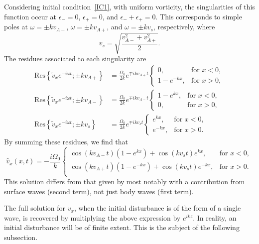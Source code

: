 \documentclass[12pt]{../style-files/ociamthesis}
\begin{document}
Considering initial condition~\ref{IC1}, with uniform vorticity, the singularities of this function occur at $\epsilon_- = 0$, $\epsilon_+ = 0$, and $\epsilon_- + \epsilon_+ = 0$. This corresponds to simple poles at $\omega = \pm kv_{A-}$, $\omega = \pm kv_{A+}$, and $\omega = \pm kv_s$, respectively, where
\begin{equation}
v_s = \sqrt{\frac{v_{A-}^2 + v_{A+}^2}{2}}.
\end{equation}
The residues associated to each singularity are
\begin{align}
\mathrm{Res}\left\{\tilde{v}_x e^{-i\omega t}; \pm kv_{A+}\right\} &= \frac{\Omega_0}{2k} e^{\mp ikv_{A+}t}
\begin{cases}
0, & \text{for  } x < 0, \\
1 - e^{-kx}, & \text{for  } x > 0, 
\end{cases} \\
\mathrm{Res}\left\{\tilde{v}_x e^{-i\omega t}; \pm kv_{A-}\right\} &= \frac{\Omega_0}{2k} e^{\mp ikv_{A-}t}
\begin{cases}
1 - e^{kx}, & \text{for  } x < 0, \\
0, & \text{for  } x > 0,
\end{cases} \\
\mathrm{Res}\left\{\tilde{v}_x e^{-i\omega t}; \pm kv_{s}\right\} &= \frac{\Omega_0}{2k} e^{\mp ikv_st} 
\begin{cases}
e^{kx}, & \text{for  } x < 0, \\
e^{-kx}, & \text{for  } x > 0.
\end{cases}
\end{align}
By summing these residues, we find that
\begin{equation}
\hat{v}_x(x, t) = -\frac{i\Omega_0}{k} \begin{cases}
\cos(kv_{A-}t)\left(1-e^{kx}\right) + \cos(kv_st)e^{kx}, & \text{for  } x<0, \\
\cos(kv_{A+}t)\left(1-e^{-kx}\right) + \cos(kv_st)e^{-kx}, & \text{for  } x>0. \\
\end{cases}
\label{sol int}
\end{equation}
This solution differs from that given by \cite{rae_etal81} most notably with a contribution from surface waves (second term), not just body waves (first term).

The full solution for $v_x$, when the initial disturbance is of the form of a single wave, is recovered by multiplying the above expression by $e^{ikz}$. In reality, an initial disturbance will be of finite extent. This is the subject of the following subsection.
\end{document}
